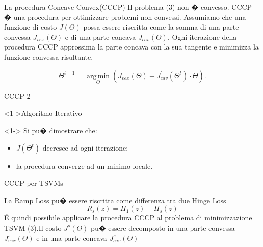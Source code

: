 \documentclass[mathserif]{beamer}
\begin{document}
\begin{frame}{La procedura Concave-Convex(CCCP)}
Il problema (3) non � convesso. CCCP � una procedura per ottimizzare problemi non convessi. 
Assumiamo che una funzione di costo $J(\Theta)$ possa essere riscritta come la somma di una parte convessa $J_{vex}(\Theta)$ e di una parte concava $J_{cav}(\Theta)$. Ogni iterazione della procedura CCCP approssima la parte concava con la sua tangente e minimizza la funzione convessa risultante.

\begin{equation}
	\Theta^{t+1}=\underset{\Theta}{\operatorname{arg\,min}}(J_{vex}(\Theta)+J_{cav}^{\prime}(\Theta^t)\cdot \Theta).
\end{equation}

\end{frame}


\begin{frame}{CCCP-2}
\begin{block}<1->{Algoritmo Iterativo}
\end{block}


\begin{block}<1-> {}
Si pu� dimostrare che:
\begin{itemize}
	\item<1->  $J(\Theta^t)$ decresce ad ogni iterazione;
	\item<1-> la procedura converge ad un minimo locale.
\end{itemize}
\end{block}
\end{frame}


\begin{frame}{CCCP per TSVMs}
\begin{block}{}
La Ramp Loss pu� essere riscritta come differenza tra due Hinge Loss
\begin{equation}
	R_s(z)=H_1(z)-H_s(z)
\end{equation}
\'E quindi possibile applicare la procedura CCCP al problema di minimizzazione TSVM (3).Il costo $J^s(\Theta)$ pu� essere decomposto in una parte convessa $J^s_{vex}(\Theta)$ e in una parte concava $J^s_{cav}(\Theta)$
\end{block}
\end{frame}
\end{document}
